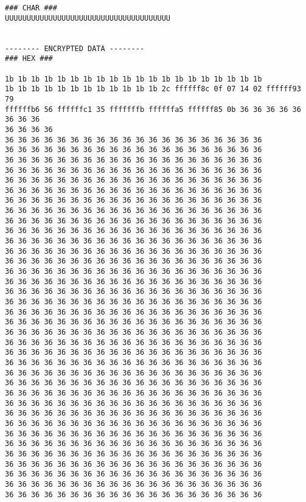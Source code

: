 \documentclass[11pt,letterpaper]{article}
\begin{document}
{\begin{verbatim}
### CHAR ###
UUUUUUUUUUUUUUUUUUUUUUUUUUUUUUUUUUUUUU


-------- ENCRYPTED DATA --------
### HEX ###

1b 1b 1b 1b 1b 1b 1b 1b 1b 1b 1b 1b 1b 1b 1b 1b 1b 1b 1b 1b 
1b 1b 1b 1b 1b 1b 1b 1b 1b 1b 1b 1b 2c ffffff8c 0f 07 14 02 ffffff93 79 
ffffffb6 56 ffffffc1 35 fffffffb ffffffa5 ffffff85 0b 36 36 36 36 36 36 36 36 
36 36 36 36 
36 36 36 36 36 36 36 36 36 36 36 36 36 36 36 36 36 36 36 36 
36 36 36 36 36 36 36 36 36 36 36 36 36 36 36 36 36 36 36 36 
36 36 36 36 36 36 36 36 36 36 36 36 36 36 36 36 36 36 36 36 
36 36 36 36 36 36 36 36 36 36 36 36 36 36 36 36 36 36 36 36 
36 36 36 36 36 36 36 36 36 36 36 36 36 36 36 36 36 36 36 36 
36 36 36 36 36 36 36 36 36 36 36 36 36 36 36 36 36 36 36 36 
36 36 36 36 36 36 36 36 36 36 36 36 36 36 36 36 36 36 36 36 
36 36 36 36 36 36 36 36 36 36 36 36 36 36 36 36 36 36 36 36 
36 36 36 36 36 36 36 36 36 36 36 36 36 36 36 36 36 36 36 36 
36 36 36 36 36 36 36 36 36 36 36 36 36 36 36 36 36 36 36 36 
36 36 36 36 36 36 36 36 36 36 36 36 36 36 36 36 36 36 36 36 
36 36 36 36 36 36 36 36 36 36 36 36 36 36 36 36 36 36 36 36 
36 36 36 36 36 36 36 36 36 36 36 36 36 36 36 36 36 36 36 36 
36 36 36 36 36 36 36 36 36 36 36 36 36 36 36 36 36 36 36 36 
36 36 36 36 36 36 36 36 36 36 36 36 36 36 36 36 36 36 36 36 
36 36 36 36 36 36 36 36 36 36 36 36 36 36 36 36 36 36 36 36 
36 36 36 36 36 36 36 36 36 36 36 36 36 36 36 36 36 36 36 36 
36 36 36 36 36 36 36 36 36 36 36 36 36 36 36 36 36 36 36 36 
36 36 36 36 36 36 36 36 36 36 36 36 36 36 36 36 36 36 36 36 
36 36 36 36 36 36 36 36 36 36 36 36 36 36 36 36 36 36 36 36 
36 36 36 36 36 36 36 36 36 36 36 36 36 36 36 36 36 36 36 36 
36 36 36 36 36 36 36 36 36 36 36 36 36 36 36 36 36 36 36 36 
36 36 36 36 36 36 36 36 36 36 36 36 36 36 36 36 36 36 36 36 
36 36 36 36 36 36 36 36 36 36 36 36 36 36 36 36 36 36 36 36 
36 36 36 36 36 36 36 36 36 36 36 36 36 36 36 36 36 36 36 36 
36 36 36 36 36 36 36 36 36 36 36 36 36 36 36 36 36 36 36 36 
36 36 36 36 36 36 36 36 36 36 36 36 36 36 36 36 36 36 36 36 
36 36 36 36 36 36 36 36 36 36 36 36 36 36 36 36 36 36 36 36 
36 36 36 36 36 36 36 36 36 36 36 36 36 36 36 36 36 36 36 36 
36 36 36 36 36 36 36 36 36 36 36 36 36 36 36 36 36 36 36 36 
36 36 36 36 36 36 36 36 36 36 36 36 36 36 36 36 36 36 36 36 
36 36 36 36 36 36 36 36 36 36 36 36 36 36 36 36 36 36 36 36 
36 36 36 36 36 36 36 36 36 36 36 36 36 36 36 36 36 36 36 36 
36 36 36 36 36 36 36 36 36 36 36 36 36 36 36 36 36 36 36 36 
36 36 36 36 36 36 36 36 36 36 36 36 36 36 36 36 36 36 36 36 
36 36 36 36 36 36 36 36 36 36 36 36 36 36 36 36 36 36 36 36 

\end{verbatim}}
\end{document}
